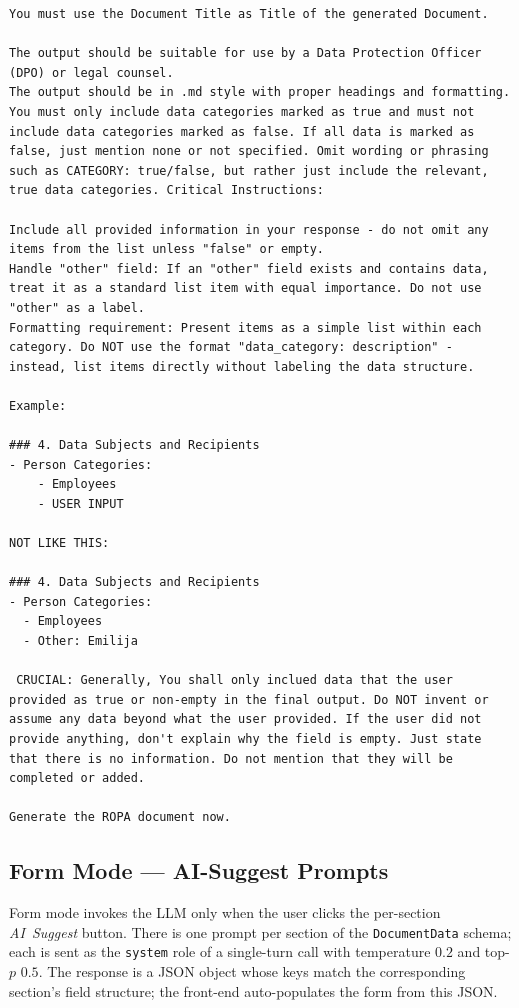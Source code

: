 \begin{lstlisting}
You must use the Document Title as Title of the generated Document. 

The output should be suitable for use by a Data Protection Officer (DPO) or legal counsel.
The output should be in .md style with proper headings and formatting. You must only include data categories marked as true and must not include data categories marked as false. If all data is marked as false, just mention none or not specified. Omit wording or phrasing such as CATEGORY: true/false, but rather just include the relevant, true data categories. Critical Instructions:

Include all provided information in your response - do not omit any items from the list unless "false" or empty.
Handle "other" field: If an "other" field exists and contains data, treat it as a standard list item with equal importance. Do not use "other" as a label.
Formatting requirement: Present items as a simple list within each category. Do NOT use the format "data_category: description" - instead, list items directly without labeling the data structure.

Example: 

### 4. Data Subjects and Recipients
- Person Categories:
    - Employees
    - USER INPUT
    
NOT LIKE THIS:

### 4. Data Subjects and Recipients
- Person Categories: 
  - Employees
  - Other: Emilija 

 CRUCIAL: Generally, You shall only inclued data that the user provided as true or non-empty in the final output. Do NOT invent or assume any data beyond what the user provided. If the user did not provide anything, don't explain why the field is empty. Just state that there is no information. Do not mention that they will be completed or added.

Generate the ROPA document now.
\end{lstlisting}

\subsection{Form Mode --- AI-Suggest Prompts}
\label{app:ropagen-prompts-form}

Form mode invokes the LLM only when the user clicks the per-section \emph{AI~Suggest} button. There is one prompt per section of the \texttt{DocumentData} schema; each is sent as the \texttt{system} role of a single-turn call with temperature $0.2$ and top-$p$ $0.5$. The response is a JSON object whose keys match the corresponding section's field structure; the front-end auto-populates the form from this JSON.

